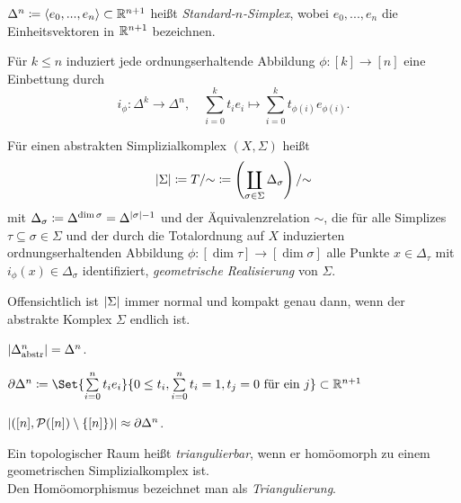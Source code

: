 \documentclass{cheat-sheet}
\begin{document}
\begin{defn}
  $\Delta^n \coloneqq \langle e_0, ..., e_n \rangle \subset \mathbb{R}^{n+1}$ heißt \emph{Standard-$n$-Simplex}, wobei $e_0, ..., e_n$ die Einheitsvektoren in $\mathbb{R}^{n+1}$ bezeichnen.
\end{defn}

\begin{bem}
  Für $k \leq n$ induziert jede ordnungserhaltende Abbildung $\phi : [k] \to [n]$ eine Einbettung durch
  \[ i_\phi : \Delta^k \to \Delta^n, \quad \sum_{i=0}^k t_i e_i \mapsto \sum_{i=0}^k t_{\phi(i)} e_{\phi(i)}. \]
\end{bem}

\begin{defn}
  Für einen abstrakten Simplizialkomplex $(X, \Sigma)$ heißt
  \[ \lvert\Sigma\rvert \coloneqq T / {\sim} \coloneqq \left( \coprod_{\sigma \in \Sigma} \Delta_\sigma \right) / {\sim} \]
  mit $\Delta_\sigma \coloneqq \Delta^{\dim \sigma} = \Delta^{\lvert\sigma\rvert - 1}$ und der Äquivalenzrelation ${\sim}$, die für alle Simplizes $\tau \subseteq \sigma \in \Sigma$ und der durch die Totalordnung auf $X$ induzierten ordnungserhaltenden Abbildung $\phi : [ \dim \tau ] \to [ \dim \sigma ]$ alle Punkte $x \in \Delta_\tau$ mit $i_\phi(x) \in \Delta_{\sigma}$ identifiziert, \emph{geometrische Realisierung} von $\Sigma$.
\end{defn}

\begin{bem}
  Offensichtlich ist $\lvert\Sigma\rvert$ immer normal und kompakt genau dann, wenn der abstrakte Komplex $\Sigma$ endlich ist.
\end{bem}

\begin{prop}
  $\lvert\Delta^n_{\text{abstr}}\rvert = \Delta^n$.
\end{prop}


\begin{defn}
  $\partial \Delta^n \coloneqq \Set{ \sum_{i=0}^n t_i e_i }{ 0 \leq t_i, \sum_{i=0}^n t_i = 1, t_j = 0 \text{ für ein } j } \subset \R^{n+1}$
\end{defn}

\begin{prop}
  $\lvert([n], \mathcal{P}([n]) \setminus \{ [n] \})\rvert \approx \partial \Delta^n$.
\end{prop}

\begin{defn}
  Ein topologischer Raum heißt \emph{triangulierbar}, wenn er homöomorph zu einem geometrischen Simplizialkomplex ist.\\
  Den Homöomorphismus bezeichnet man als \emph{Triangulierung}.
\end{defn}
\end{document}
